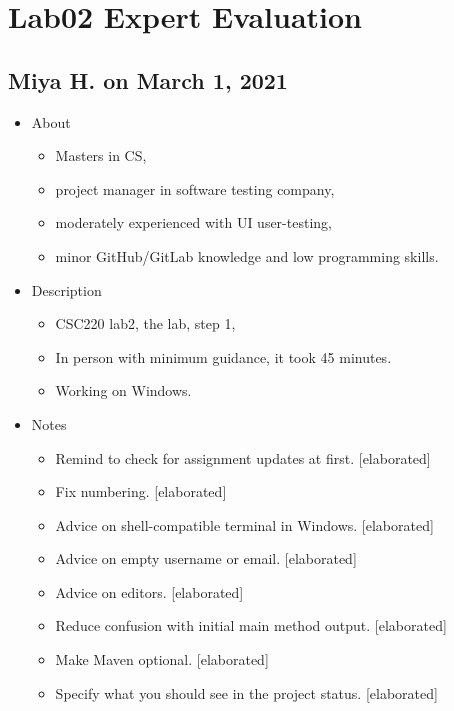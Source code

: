 \section{Lab02 Expert Evaluation}\label{sec:lab02exp}

\subsection{Miya H. on March 1, 2021}\label{ssec:miya0301}

\begin{itemize}
\item
  {About}
  \begin{itemize}
  \item
    {Masters in CS,}
  \item
    {project manager in software testing company,}
  \item
    {moderately experienced with UI user-testing,}
  \item
    {minor GitHub/GitLab knowledge and low programming skills.}
  \end{itemize}

\item
  {Description}
  \begin{itemize}
  \item
    {CSC220 lab2, the lab, step 1,}
  \item
    {In person with minimum guidance, it took 45 minutes.}
  \item
    {Working on Windows.}
  \end{itemize}

\item
  {Notes}
  \begin{itemize}
  \item
    {Remind to check for assignment updates at first. {[}elaborated{]}}
  \item
    {Fix numbering. {[}elaborated{]}}
  \item
    {Advice on shell-compatible terminal in Windows. {[}elaborated{]}}
  \item
    {Advice on empty username or email. {[}elaborated{]}}
  \item
    {Advice on editors. {[}elaborated{]}}
  \item
    {Reduce confusion with initial main method output. {[}elaborated{]}}
  \item
    {Make Maven optional. {[}elaborated{]}}
  \item
    {Specify what you should see in the project status. {[}elaborated{]}}
  \end{itemize}


\end{itemize}
